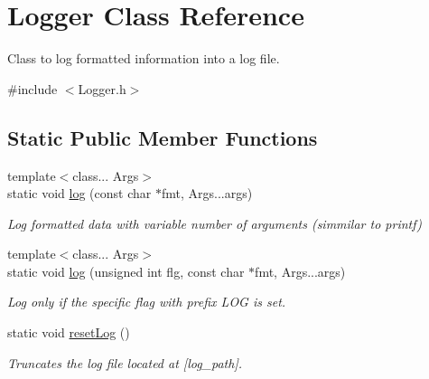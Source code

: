 \hypertarget{classLogger}{}\section{Logger Class Reference}
\label{classLogger}


Class to log formatted information into a log file.  




{\ttfamily \#include $<$Logger.\+h$>$}

\subsection*{Static Public Member Functions}
\begin{DoxyCompactItemize}
\item 
{\footnotesize template$<$class... Args$>$ }\\static void \hyperlink{classLogger_aad1588639bb45eab5a33a40fc58d0e94}{log} (const char $\ast$fmt, Args...\+args)
\begin{DoxyCompactList}\small\item\em Log formatted data with variable number of arguments (simmilar to printf) \end{DoxyCompactList}\item 
{\footnotesize template$<$class... Args$>$ }\\static void \hyperlink{classLogger_ac5ac87e0629a7b4073a57798026df92a}{log} (unsigned int flg, const char $\ast$fmt, Args...\+args)
\begin{DoxyCompactList}\small\item\em Log only if the specific flag with prefix L\+OG is set. \end{DoxyCompactList}\item 
static void \hyperlink{classLogger_a8b31dfd3a063f40f232f0549e962132d}{reset\+Log} ()
\begin{DoxyCompactList}\small\item\em Truncates the log file located at \mbox{[}log\+\_\+path\mbox{]}. \end{DoxyCompactList}\end{DoxyCompactItemize}
